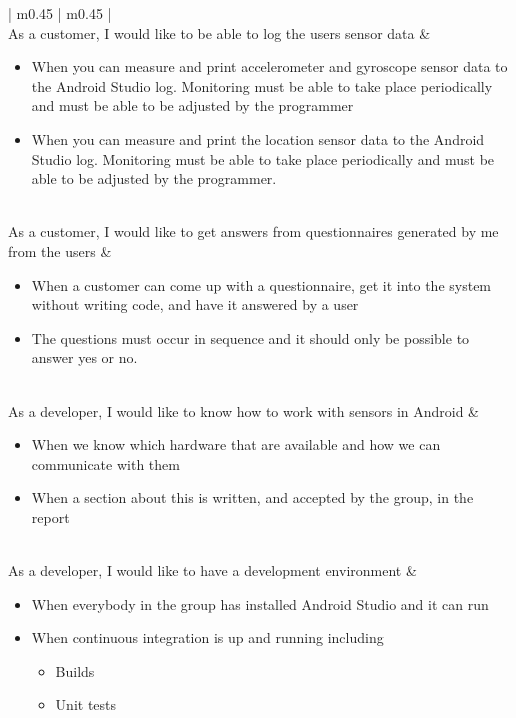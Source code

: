 \begin{center}
\begin{longtable}{| m{} | m{} |}
	 \\ \hline
	As a customer, I would like to be able to log the users sensor data & 
	\begin{itemize}[noitemsep,topsep=0pt,parsep=0pt,partopsep=0pt]
	 	\item When you can measure and print accelerometer and gyroscope sensor data to the Android Studio log. Monitoring must be able to take place periodically and must be able to be adjusted by the programmer
	 	\item When you can measure and print the location sensor data to the Android Studio log. Monitoring must be able to take place periodically and must be able to be adjusted by the programmer.
	 \end{itemize} \\ \hline
	As a customer, I would like to get answers from questionnaires generated by me from the users & 
	\begin{itemize}[noitemsep,topsep=0pt,parsep=0pt,partopsep=0pt]
	 	\item When a customer can come up with a questionnaire, get it into the system without writing code, and have it answered by a user
	 	\item The questions must occur in sequence and it should only be possible to answer yes or no.
	 \end{itemize} \\ \hline
	As a developer, I would like to know how to work with sensors in Android & 
	\begin{itemize}[noitemsep,topsep=0pt,parsep=0pt,partopsep=0pt]
		\item When we know which hardware that are available and how we can communicate with them 
		\item When a section about this is written, and accepted by the group, in the report
	\end{itemize} \\ \hline
	As a developer, I would like to have a development environment & 
	\begin{itemize}[noitemsep,topsep=0pt,parsep=0pt,partopsep=0pt]
		\item When everybody in the group has installed Android Studio and it can run
		\item When continuous integration is up and running including 
			\begin{itemize}[noitemsep,topsep=0pt,parsep=0pt,partopsep=0pt]
				\item Builds
				\item Unit tests

\end{itemize}
\end{itemize}
\end{longtable}
\end{center}
